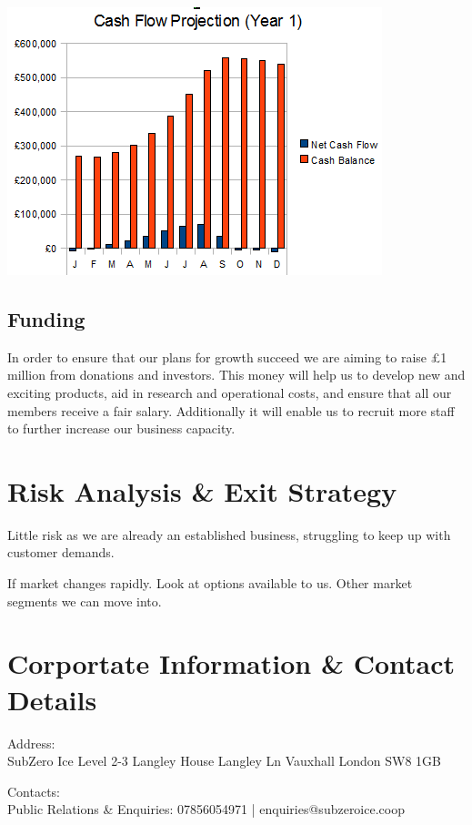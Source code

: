 \documentclass{article}
\begin{document}
\includegraphics[scale=1.0]{cashFlowYear1.png}

\subsection{Funding}

In order to ensure that our plans for growth succeed we are aiming to raise £1 million from donations and investors. This money will help us to develop new and exciting products, aid in research and operational costs, and ensure that all our members receive a fair salary. Additionally it will enable us to recruit more staff to further increase our business capacity.

\section{Risk Analysis \& Exit Strategy}


Little risk as we are already an established business, struggling to keep up with customer demands.

If market changes rapidly. Look at options available to us. Other market segments we can move into.



\section{Corportate Information \& Contact Details}

Address: \\

SubZero Ice
Level 2-3 
Langley House
Langley Ln
Vauxhall
London
SW8 1GB

Contacts: \\

Public Relations \& Enquiries: 07856054971 | enquiries@subzeroice.coop
\end{document}
